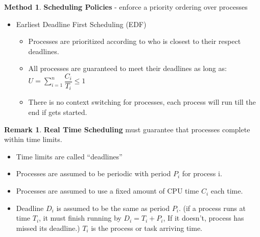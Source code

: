 \documentclass[11pt,a4paper]{article}
\theoremstyle{definition}
\newtheorem*{remark}{Remark}
\newtheorem{method}{Method}[section]
\newenvironment{myitemize}
{ \begin{itemize}
    \setlength{\itemsep}{5pt}
    \setlength{\parskip}{0pt}
    \setlength{\parsep}{0pt}     }
{ \end{itemize}                  }
\begin{document}
\begin{method}{\textbf{Scheduling Policies} - enforce a priority ordering over processes}
\begin{myitemize}
\begin{myitemize}
\begin{myitemize}
				\item \textbf{Critical Instance Analysis} is used to test that all processes meet their deadlines
				\item We can also write down the table to see and the pattern will repeat for every $LCM ( P_1, \dots, P_n )$.
			\end{myitemize}
			\item Earliest Deadline First Scheduling (\textsf{EDF})
			\begin{myitemize}
				\item Processes are prioritized according to who is closest to their respect deadlines.
				\item All processes are guaranteed to meet their deadlines as long as: $U=\sum^n_{i=1}\dfrac{C_i}{T_i} \leq 1$
				\item There is no context switching for processes, each process will run till the end if gets started.
			\end{myitemize}
		\end{myitemize}
	\end{myitemize}
\end{method}

\begin{remark}{\textbf{Real Time Scheduling}}
	must guarantee that processes complete within time limits.
	
	\begin{myitemize}
		\item Time limits are called “deadlines”
		\item Processes are assumed to be periodic with period $P_i$ for process i.
		\item Processes are assumed to use a fixed amount of CPU time $C_i$ each time.
		\item Deadline $D_i$ is assumed to be the same as period $P_i$. (if a process runs at time $T_i$, it must finish running by $D_i=T_i+P_i$, If it doesn’t, process has missed its deadline.) $T_i$ is the process or task arriving time.
	\end{myitemize}
\end{remark}
\end{document}

